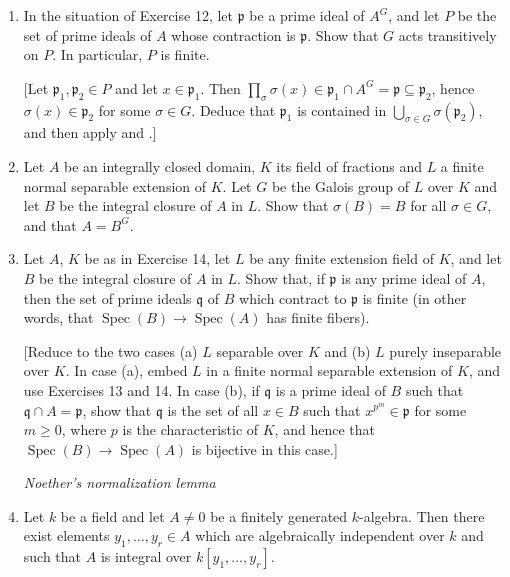 \begin{enumerate}
\item In the situation of Exercise 12, let $\mathfrak p$ be a prime ideal of $A^G$, and let $P$ be the set of prime ideals of $A$ whose contraction is $\mathfrak p$. Show that $G$ acts transitively on $P$. In particular, $P$ is finite.

[Let $\mathfrak p_1,\mathfrak p_2\in P$ and let $x\in\mathfrak p_1$. Then $\prod_\sigma\sigma(x)\in\mathfrak p_1\cap A^G=\mathfrak p\subseteq\mathfrak p_2$, hence $\sigma(x)\in\mathfrak p_2$ for some $\sigma\in G$. Deduce that $\mathfrak p_1$ is contained in $\bigcup_{\sigma\in G}\sigma(\mathfrak p_2)$, and then apply  and .]

\item Let $A$ be an integrally closed domain, $K$ its field of fractions and $L$ a finite normal separable extension of $K$. Let $G$ be the Galois group of $L$ over $K$ and let $B$ be the integral closure of $A$ in $L$. Show that $\sigma(B)=B$ for all $\sigma\in G$, and that $A=B^G$.

\item Let $A$, $K$ be as in Exercise 14, let $L$ be any finite extension field of $K$, and let $B$ be the integral closure of $A$ in $L$. Show that, if $\mathfrak p$ is any prime ideal of $A$, then the set of prime ideals $\mathfrak q$ of $B$ which contract to $\mathfrak p$ is finite (in other words, that $\operatorname{Spec}(B)\longrightarrow\operatorname{Spec}(A)$ has finite fibers).

[Reduce to the two cases (a) $L$ separable over $K$ and (b) $L$ purely inseparable over $K$. In case (a), embed $L$ in a finite normal separable extension of $K$, and use Exercises 13 and 14. In case (b), if $\mathfrak q$ is a prime ideal of $B$ such that $\mathfrak q\cap A=\mathfrak p$, show that $\mathfrak q$ is the set of all $x\in B$ such that $x^{p^m}\in\mathfrak p$ for some $m\geq0$, where $p$ is the characteristic of $K$, and hence that $\operatorname{Spec}(B)\longrightarrow\operatorname{Spec}(A)$ is bijective in this case.]

\noindent\textit{Noether's normalization lemma}

\item Let $k$ be a field and let $A\neq0$ be a finitely generated $k$-algebra. Then there exist elements $y_1,\ldots,y_r\in A$ which are algebraically independent over $k$ and such that $A$ is integral over $k[y_1,\ldots,y_r]$.


\end{enumerate}
